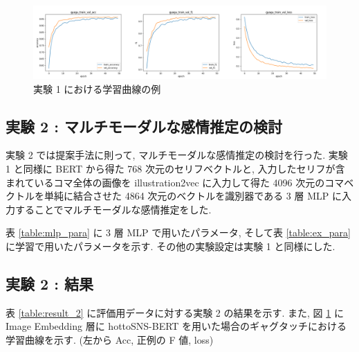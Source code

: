 \begin{figure}[h]
  \centering
  \includegraphics[width=0.8\hsize]{doc/figures/ex1_graph_hotto_gyagu.png}
  \caption{実験 1 における学習曲線の例}
  \label{fig:ex1_graph}
\end{figure}

\newpage
\changeindent{0cm}
\subsection{実験 2 : マルチモーダルな感情推定の検討}
\changeindent{2cm}

実験 2 では提案手法に則って, マルチモーダルな感情推定の検討を行った.
実験 1 と同様に BERT から得た 768 次元のセリフベクトルと, 入力したセリフが含まれているコマ全体の画像を illustration2vec に入力して得た 4096 次元のコマベクトルを単純に結合させた 4864 次元のベクトルを識別器である 3 層 MLP に入力することでマルチモーダルな感情推定をした.

表 \ref{table:mlp_para} に 3 層 MLP で用いたパラメータ, そして表 \ref{table:ex_para} に学習で用いたパラメータを示す. その他の実験設定は実験 1 と同様にした.


\changeindent{0cm}
\subsection{実験 2 : 結果}
\changeindent{2cm}

表 \ref{table:result_2} に評価用データに対する実験 2 の結果を示す. また, 図 \ref{fig:ex1_graph} に Image Embedding 層に hottoSNS-BERT を用いた場合のギャグタッチにおける学習曲線を示す. (左から Acc, 正例の F 値, loss)

